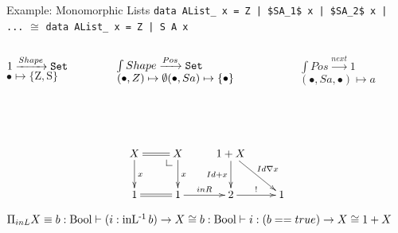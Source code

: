 \documentclass{beamer}
\makeatletter
\newcommand{\dlpullback}[1][dl]{\save*!/#1-1.2pc/#1:(-1,1)@^{|-}\restore}
\newcommand{\Set}{{\tt Set }}
\makeatother
\begin{document}
\begin{frame}[fragile]{Example: Monomorphic Lists}
\lstinline+data AList_ x = Z | $SA_1$ x | $SA_2$ x | ...+ $\cong$ \lstinline+data AList_ x = Z | S A x+
\pause
\begin{columns}
\begin{block}{$1 \xrightarrow{Shape} \Set$}
$\bullet \mapsto \{\mbox{Z},\mbox{S}\}$
\end{block}

\begin{block}{$\int Shape \xrightarrow{Pos} \Set$}
$(\bullet, Z) \mapsto \emptyset\\
(\bullet, S a) \mapsto \{\bullet\}$
\end{block}

\begin{block}{$\int Pos \xrightarrow{next} 1$}
$(\bullet,S a,\bullet) \mapsto a$
\end{block}
\end{columns}
\\~\\
\pause
 \[\xymatrix{
 X \ar[d]^{x} \ar@{=}[r] & X \ar[d]^{x} \dlpullback & 1 + X \ar[d]_{Id + x} \ar[dr]^{Id \nabla x} & \\
 1 & 1 \ar@{=}[l] \ar[r]^{inR} & 2 \ar[r]^{!} & 1}\]
\pause
 
  $\Pi_{inL} X \equiv \\
  b : \mbox{Bool} \vdash (i : \operatorname{inL^{-1}} b) \to X\\
  \cong b : \mbox{Bool} \vdash i : (b==true) \to X \\
  \cong 1 + X$

\end{frame}
\end{document}
